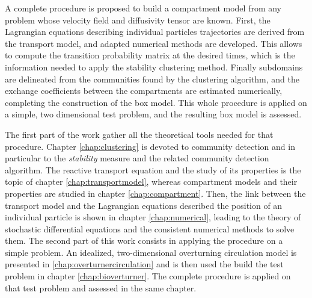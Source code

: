 A complete procedure is proposed to build a compartment model from any problem whose velocity field and diffusivity tensor are known. First, the Lagrangian equations describing individual particles trajectories are derived from the transport model, and adapted numerical methods are developed. This allows to compute the transition probability matrix at the desired times, which is the information needed to apply the stability clustering method. Finally subdomains are delineated from the communities found by the clustering algorithm, and the exchange coefficients between the compartments are estimated numerically, completing the construction of the box model. This whole procedure is applied on a simple, two dimensional test problem, and the resulting box model is assessed.  

The first part of the work gather all the theoretical tools needed for that procedure. Chapter \ref{chap:clustering} is devoted to community detection and in particular to the \textit{stability} measure and the related community detection algorithm. The reactive transport equation and the study of its properties is the topic of chapter \ref{chap:transportmodel}, whereas compartment models and their properties are studied in chapter \ref{chap:compartment}. Then, the link between the transport model and the Lagrangian equations described the position of an individual particle is shown in chapter \ref{chap:numerical}, leading to the theory of stochastic differential equations and the consistent numerical methods to solve them. The second part of this work consists in applying the procedure on a simple problem. An idealized, two-dimensional overturning circulation model is presented in \ref{chap:overturnercirculation} and is then used the build the test problem in chapter \ref{chap:bioverturner}. The complete procedure is applied on that test problem and assessed in the same chapter. 


